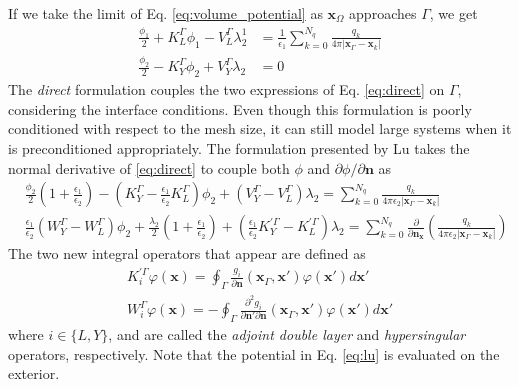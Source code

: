 If we take the limit of Eq. \eqref{eq:volume_potential} as $\mathbf{x}_{\Omega}$ approaches $\Gamma$, we get
%
\begin{align} \label{eq:direct}
\tfrac{\phi_1}{2}+ K_{L}^{\Gamma}\phi_1 -  V_{L}^{\Gamma} \lambda_2^1 & = \tfrac{1}{\epsilon_1} \sum_{k=0}^{N_q}  \frac{q_k}{4\pi|\mathbf{x}_{\Gamma} - \mathbf{x}_k|} \nonumber \\
\tfrac{\phi_2}{2} - K_{Y}^{\Gamma}\phi_2 + V_{Y}^{\Gamma} \lambda_2 & = 0
\end{align}
%
The {\it direct} formulation\cite{YoonLenhoff1990} couples the two expressions of Eq. \eqref{eq:direct} on $\Gamma$, considering the interface conditions. Even though this formulation is poorly conditioned with respect to the mesh size, it can still model large systems when it is preconditioned appropriately.\cite{AltmanBardhanWhiteTidor09,MartinezETal2019,wang2021high} 
The formulation presented by Lu\cite{LuETal2006} takes the normal derivative of \eqref{eq:direct} to couple both $\phi$ and $\partial\phi/\partial\mathbf{n}$ as
%
\begin{align}\label{eq:lu}
    & \tfrac{\phi_2}{2}\left(1+\tfrac{\epsilon_1}{\epsilon_2}\right) - \left(K_Y^\Gamma - \tfrac{\epsilon_1}{\epsilon_2}K_L^\Gamma\right)\phi_2 + \left(V_Y^\Gamma - V_L^\Gamma\right)\lambda_2 = \sum_{k=0}^{N_q}  \frac{q_k}{4\pi\epsilon_2|\mathbf{x}_{\Gamma} - \mathbf{x}_k|}
     \nonumber \\
    &\tfrac{\epsilon_1}{\epsilon_2}\left(W_Y^\Gamma - W_L^\Gamma\right)\phi_2 +  \tfrac{\lambda_2}{2}\left(1+\tfrac{\epsilon_1}{\epsilon_2}\right) + \left(\tfrac{\epsilon_1}{\epsilon_2}K_Y^{\prime\Gamma} - K_L^{\prime\Gamma}\right)\lambda_2 = \sum_{k=0}^{N_q}  \frac{\partial}{\partial\mathbf{n}_\mathbf{x}}\left(\frac{q_k}{4\pi\epsilon_2|\mathbf{x}_{\Gamma} - \mathbf{x}_k|}\right)
\end{align}
%
The two new integral operators that appear are defined as 
%
\begin{align}
\label{eq:adj_hyp}
K^{\prime\Gamma}_i\varphi (\mathbf{x}) = \oint_\Gamma \frac{g_i}{\partial\mathbf{n}}(\mathbf{x}_\Gamma,\mathbf{x}')\varphi(\mathbf{x}')d\mathbf{x}'\nonumber\\
W^\Gamma_i\varphi (\mathbf{x}) = - \oint_\Gamma \frac{\partial^2 g_i}{\partial\mathbf{n}'\partial\mathbf{n}}(\mathbf{x}_\Gamma,\mathbf{x}')\varphi(\mathbf{x}')d\mathbf{x}'
\end{align}
where $i \in \{L,Y\}$, 
and are called the {\it  adjoint double layer} and {\it hypersingular} operators, respectively. Note that the potential in Eq. \eqref{eq:lu} is evaluated on the exterior. 
